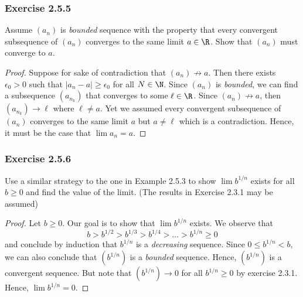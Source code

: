 \subsubsection{Exercise 2.5.5} Assume \((a_n)\) is \textit{bounded} sequence with the property that every convergent subsequence of \((a_n)\) converges to the same limit \(a \in \R\). Show that \((a_n)\) must converge to \(a\).
\begin{proof}
    Suppose for sake of contradiction that \((a_n) \not\to a\). Then there exists \(\epsilon_0 > 0\) such that \(|a_n - a| \geq \epsilon_0\) for all \(N \in \N \). Since \((a_n)\) is \textit{bounded}, we can find a subsequence \((a_{n_k})\) that converges to some \( \ell \in \R \). Since \((a_n) \not\to a\), then \( (a_{n_k}) \to \ell \) where \( \ell \neq a\). Yet we assumed every convergent subsequence of \((a_n)\) converges to the same limit \( a \) but \( a \neq \ell \) which is a contradiction. Hence, it must be the case that \( \lim a_n = a \).
\end{proof}
\subsubsection{Exercise 2.5.6}
Use a similar strategy to the one in Example 2.5.3 to show \(\lim b^{1/n} \) exists for all \( b \geq 0\) and find the value of the limit. (The results in Exercise 2.3.1 may be assumed)
\begin{proof}
    Let \(b \geq 0 \). Our goal is to show that \( \lim b^{1/n}\) exists. We observe that 
    \[b > b^{1/2} > b^{1/3} > b^{1/4} > ... >  b^{1/n} \geq 0\]
    and conclude by induction that \(b^{1/n}\) is a \textit{decreasing}
    sequence. Since \( 0 \leq b^{1/n} < b\), we can also conclude that \( (b^{1/n})\) is a \textit{bounded} sequence. Hence, \((b^{1/n})\) is a convergent sequence. But note that \((b^{1/n}) \to 0\) for all \(b^{1/n} \geq 0\) by exercise 2.3.1. Hence, \(\lim b^{1/n} = 0\).
\end{proof}

